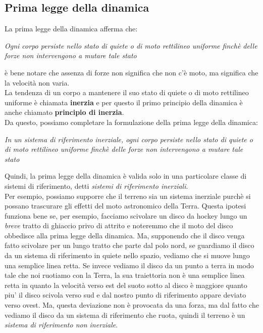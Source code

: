 \documentclass[12pt]{report}
\begin{document}
	\subsection{Prima legge della dinamica}
	La prima legge della dinamica afferma che:
	\begin{center}
		\textit{Ogni corpo persiste nello stato di quiete o di moto rettilineo uniforme finchè  delle forze non intervengono a mutare tale stato}
	\end{center}
	è  bene notare che assenza di forze non significa che non c'è  moto, ma significa che la velocità non varia. \\
	La tendenza di un corpo a mantenere il suo stato di quiete o di moto rettilineo uniforme è  chiamata \textbf{inerzia} e per questo il primo principio della dinamica è  anche chiamato \textbf{principio di inerzia}. \\
	Da questo, possiamo completare la formulazione della prima legge della dinamica:
	\begin{center}
		\textit{In un sistema di riferimento inerziale, ogni corpo persiste nello stato di quiete o di moto rettilineo uniforme finchè  delle forze non intervengono a mutare tale stato}
	\end{center}
	Quindi, la prima legge della dinamica è  valida solo in una particolare classe di sistemi di riferimento, detti \textit{sistemi di riferimento inerziali}. \\
	Per esempio, possiamo supporre che il terreno sia un sistema inerziale purchè  si possano trascurare gli effetti del moto astronomico della Terra. Questa ipotesi funziona bene se, per esempio, facciamo scivolare un disco da hockey lungo un \textit{breve} tratto di ghiaccio privo di attrito e noteremmo che il moto del disco obbedisce alla prima legge della dinamica. Ma, supponendo che il disco venga fatto scivolare per un lungo tratto che parte dal polo nord, se guardiamo il disco da un sistema di riferimento in quiete nello spazio, vediamo che si muove lungo una semplice linea retta. Se invece vediamo il disco da un punto a terra in modo tale che noi ruotiamo con la Terra, la sua traiettoria non è  una semplice linea retta in quanto la velocità verso est del suoto sotto al disco è  maggiore quanto piu' il disco scivola verso sud e dal nostro punto di riferimento appare deviato verso ovest. Ma, questa deviazione non è  provocata da una forza, ma dal fatto che vediamo il disco da un sistema di riferimento che ruota, quindi il terreno è  un \textit{sistema di riferimento non inerziale}.
\end{document}

